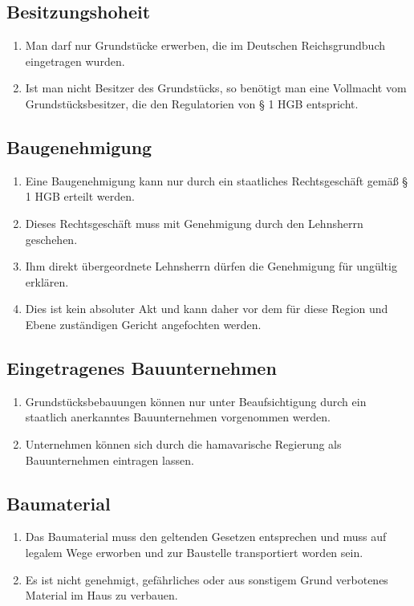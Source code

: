 \documentclass{article}
\begin{document}
\subsection{Besitzungshoheit}
\begin{enumerate}[(1)]
    \item Man darf nur Grundstücke erwerben, die im Deutschen Reichsgrundbuch eingetragen wurden.
    \item Ist man nicht Besitzer des Grundstücks, so benötigt man eine Vollmacht vom Grundstücksbesitzer, die den Regulatorien von § 1 HGB entspricht.
\end{enumerate}

\subsection{Baugenehmigung} \label{baugen}
\begin{enumerate}[(1)]
    \item Eine Baugenehmigung kann nur durch ein staatliches Rechtsgeschäft gemäß § 1 HGB erteilt werden.
    \item Dieses Rechtsgeschäft muss mit Genehmigung durch den Lehnsherrn geschehen.
    \item Ihm direkt übergeordnete Lehnsherrn dürfen die Genehmigung für ungültig erklären.
    \item Dies ist kein absoluter Akt und kann daher vor dem für diese Region und Ebene zuständigen Gericht angefochten werden.
\end{enumerate}

\subsection{Eingetragenes Bauunternehmen} \label{bauunt}
\begin{enumerate}[(1)]
    \item Grundstücksbebauungen können nur unter Beaufsichtigung durch ein staatlich anerkanntes Bauunternehmen vorgenommen werden.
    \item Unternehmen können sich durch die hamavarische Regierung als Bauunternehmen eintragen lassen.
\end{enumerate}

\subsection{Baumaterial}
\begin{enumerate}[(1)]
    \item Das Baumaterial muss den geltenden Gesetzen entsprechen und muss auf legalem Wege erworben und zur Baustelle transportiert worden sein.
    \item Es ist nicht genehmigt, gefährliches oder aus sonstigem Grund verbotenes Material im Haus zu verbauen.
\end{enumerate}
\newpage
\end{document}
